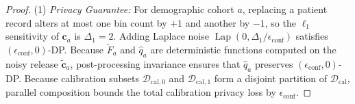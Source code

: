 \documentclass[3p,12pt]{elsarticle}
\theoremstyle{plain}
\theoremstyle{definition}
\begin{document}
\begin{proof}
(1) \emph{Privacy Guarantee:} For demographic cohort $a$, replacing a patient record alters at most one bin count by $+1$ and another by $-1$, so the $\ell_1$ sensitivity of $\mathbf{c}_a$ is $\Delta_1 = 2$. Adding Laplace noise $\operatorname{Lap}(0, \Delta_1/\epsilon_{\text{conf}})$ satisfies $(\epsilon_{\text{conf}}, 0)$-DP. Because $\widetilde{F}_a$ and $\hat{q}_a$ are deterministic functions computed on the noisy release $\tilde{\mathbf{c}}_a$, post-processing invariance ensures that $\hat{q}_a$ preserves $(\epsilon_{\text{conf}}, 0)$-DP. Because calibration subsets $\mathcal{D}_{\text{cal}, 0}$ and $\mathcal{D}_{\text{cal}, 1}$ form a disjoint partition of $\mathcal{D}_{\text{cal}}$, parallel composition bounds the total calibration privacy loss by $\epsilon_{\text{conf}}$.


\end{proof}
\end{document}
